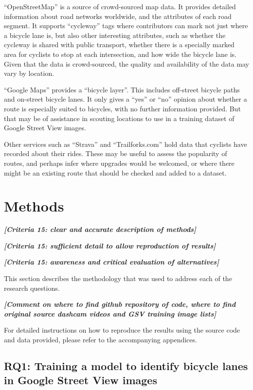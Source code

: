 \documentclass[11pt,twoside]{report}
\newcommand{\remark}[1]{{\bf \em [\marginpar{$\Leftarrow$}#1]}}
\begin{document}
``OpenStreetMap'' \cite{OPENSTREETMAP} is a source of crowd-sourced map data.  It provides detailed information about road networks worldwide, and the attributes of each road segment.  It supports ``cycleway'' tags where contributors can mark not just where a bicycle lane is, but also other interesting attributes, such as whether the cycleway is shared with public transport, whether there is a specially marked area for cyclists to stop at each intersection, and how wide the bicycle lane is.  Given that the data is crowd-sourced, the quality and availability of the data may vary by location.

``Google Maps'' provides a ``bicycle layer''.  This includes off-street bicycle paths and on-street bicycle lanes.  It only gives a ``yes'' or ``no'' opinion about whether a route is especially suited to bicycles, with no further information provided.  But that may be of assistance in scouting locations to use in a training dataset of Google Street View images.

Other services such as ``Strava'' and ``Trailforks.com'' hold data that cyclists have recorded about their rides.  These may be useful to assess the popularity of routes, and perhaps infer where upgrades would be welcomed, or where there might be an existing route that should be checked and added to a dataset.


\chapter{Methods}

\remark{Criteria 15: clear and accurate description of methods}

\remark{Criteria 15: sufficient detail to allow reproduction of results}

\remark{Criteria 15: awareness and critical evaluation of alternatives}

This section describes the methodology that was used to address each of the research questions.

\remark{Comment on where to find github repository of code, where to find original source dashcam videos and GSV training image lists}

For detailed instructions on how to reproduce the results using the source code and data provided, please refer to the accompanying appendices.

\section{RQ1: Training a model to identify bicycle lanes in Google Street View images}
\label{s:rq1}
\end{document}
